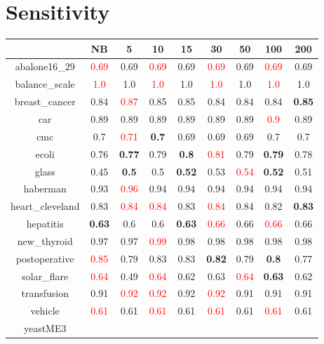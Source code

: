 \documentclass{article}%
\begin{document}
\section*{Sensitivity}%
\begin{tabular}{c|cccccccc}%
\hline%
&NB&5&10&15&30&50&100&200\\%
\hline%
abalone16\_29&\textcolor{red}{ 
0.69
}&0.69&\textcolor{red}{ 
0.69
}&0.69&\textcolor{red}{ 
0.69
}&0.69&\textcolor{red}{ 
0.69
}&0.69\\%
\hline%
balance\_scale&\textcolor{red}{ 
1.0
}&1.0&\textcolor{red}{ 
1.0
}&1.0&\textcolor{red}{ 
1.0
}&1.0&\textcolor{red}{ 
1.0
}&1.0\\%
\hline%
breast\_cancer&0.84&\textcolor{red}{ 
0.87
}&0.85&0.85&0.84&0.84&0.84&\textbf{0.85}\\%
\hline%
car&0.89&0.89&0.89&0.89&0.89&0.89&\textcolor{red}{ 
0.9
}&0.89\\%
\hline%
cmc&0.7&\textcolor{red}{ 
0.71
}&\textbf{0.7}&0.69&0.69&0.69&0.7&0.7\\%
\hline%
ecoli&0.76&\textbf{0.77}&0.79&\textbf{0.8}&\textcolor{red}{ 
0.81
}&0.79&\textbf{0.79}&0.78\\%
\hline%
glass&0.45&\textbf{0.5}&0.5&\textbf{0.52}&0.53&\textcolor{red}{ 
0.54
}&\textbf{0.52}&0.51\\%
\hline%
haberman&0.93&\textcolor{red}{ 
0.96
}&0.94&0.94&0.94&0.94&0.94&0.94\\%
\hline%
heart\_cleveland&0.83&\textcolor{red}{ 
0.84
}&\textcolor{red}{ 
0.84
}&0.83&\textcolor{red}{ 
0.84
}&0.84&0.82&\textbf{0.83}\\%
\hline%
hepatitis&\textbf{0.63}&0.6&0.6&\textbf{0.63}&\textcolor{red}{ 
0.66
}&0.66&\textcolor{red}{ 
0.66
}&0.66\\%
\hline%
new\_thyroid&0.97&0.97&\textcolor{red}{ 
0.99
}&0.98&0.98&0.98&0.98&0.98\\%
\hline%
postoperative&\textcolor{red}{ 
0.85
}&0.79&0.83&0.83&\textbf{0.82}&0.79&\textbf{0.8}&0.77\\%
\hline%
solar\_flare&\textcolor{red}{ 
0.64
}&0.49&\textcolor{red}{ 
0.64
}&0.62&0.63&\textcolor{red}{ 
0.64
}&\textbf{0.63}&0.62\\%
\hline%
transfusion&0.91&\textcolor{red}{ 
0.92
}&\textcolor{red}{ 
0.92
}&0.92&\textcolor{red}{ 
0.92
}&0.91&0.91&0.91\\%
\hline%
vehicle&\textcolor{red}{ 
0.61
}&0.61&\textcolor{red}{ 
0.61
}&0.61&\textcolor{red}{ 
0.61
}&0.61&\textcolor{red}{ 
0.61
}&0.61\\%
\hline%
yeastME3&\textcolor{red}{ 
}
\end{tabular}
\end{document}
